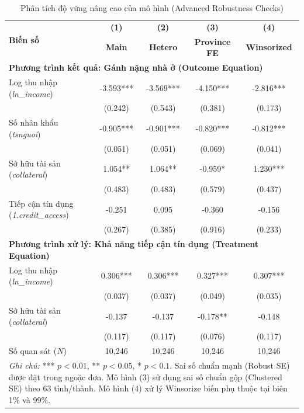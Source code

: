 \documentclass[12pt,a4paper]{report}
\begin{document}
\begin{table}[htbp]
	\centering
	\caption{Phân tích độ vững nâng cao của mô hình (Advanced Robustness Checks)}
	\label{tab:advanced_robustness}
	\small
	\begin{tabular}{lcccc}
		\toprule
		\multirow{2}{*}{\textbf{Biến số}} & \textbf{(1)} & \textbf{(2)} & \textbf{(3)} & \textbf{(4)} \\
		& \textbf{Main} & \textbf{Hetero} & \textbf{Province FE} & \textbf{Winsorized} \\
		\midrule
		\multicolumn{5}{l}{\textbf{Phương trình kết quả: Gánh nặng nhà ở (Outcome Equation)}} \\
		\midrule
		Log thu nhập (\textit{ln\_income}) & -3.593*** & -3.569*** & -4.150*** & -2.816*** \\
		& (0.242) & (0.543) & (0.381) & (0.173) \\
		Số nhân khẩu (\textit{tsnguoi}) & -0.905*** & -0.901*** & -0.820*** & -0.812*** \\
		& (0.051) & (0.051) & (0.069) & (0.041) \\
		Sở hữu tài sản (\textit{collateral}) & 1.054** & 1.064** & -0.959* & 1.230*** \\
		& (0.483) & (0.483) & (0.579) & (0.437) \\
		Tiếp cận tín dụng (\textit{1.credit\_access}) & -0.251 & 0.095 & -0.360 & -0.156 \\
		& (0.267) & (0.385) & (0.916) & (0.233) \\
		\midrule
		\multicolumn{5}{l}{\textbf{Phương trình xử lý: Khả năng tiếp cận tín dụng (Treatment Equation)}} \\
		\midrule
		Log thu nhập (\textit{ln\_income}) & 0.306*** & 0.306*** & 0.327*** & 0.307*** \\
		& (0.037) & (0.037) & (0.049) & (0.035) \\
		Sở hữu tài sản (\textit{collateral}) & -0.137 & -0.137 & -0.178** & -0.148 \\
		& (0.117) & (0.117) & (0.076) & (0.117) \\
		\midrule
		Số quan sát ($N$) & 10,246 & 10,246 & 10,246 & 10,246 \\
		\bottomrule
		\multicolumn{5}{p{14cm}}{\footnotesize \textit{Ghi chú:} *** $p<0.01$, ** $p<0.05$, * $p<0.1$. Sai số chuẩn mạnh (Robust SE) được đặt trong ngoặc đơn. Mô hình (3) sử dụng sai số chuẩn gộp (Clustered SE) theo 63 tỉnh/thành. Mô hình (4) xử lý Winsorize biến phụ thuộc tại biên 1\% và 99\%.}
	\end{tabular}
\end{table}
\end{document}
